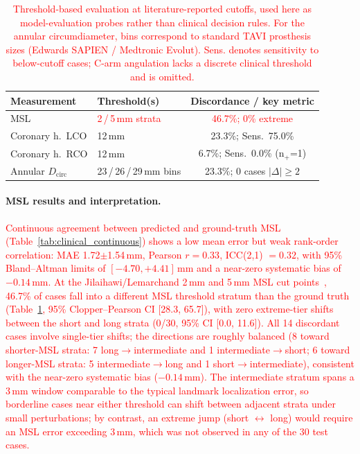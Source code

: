 \documentclass[conference]{IEEEtran}
\begin{document}
\begin{table}[t]
\centering
\caption{\textcolor{red}{Threshold-based evaluation at literature-reported cutoffs, used here as model-evaluation probes rather than clinical decision rules. For the annular circumdiameter, bins correspond to standard TAVI prosthesis sizes (Edwards SAPIEN / Medtronic Evolut). Sens. denotes sensitivity to below-cutoff cases; C-arm angulation lacks a discrete clinical threshold and is omitted.}}
\label{tab:clinical_discordance}
\setlength{\tabcolsep}{3pt}
\footnotesize
\begin{tabular}{l l c}
\toprule
Measurement & Threshold(s) & Discordance / key metric \\
\midrule
MSL                   & \textcolor{red}{2\,/\,5\,mm strata}              & \textcolor{red}{46.7\%; 0\% extreme} \\
Coronary h.\ LCO      & 12\,mm                            & 23.3\%; Sens.\ 75.0\%     \\
Coronary h.\ RCO      & 12\,mm                            & 6.7\%; Sens.\ 0.0\% (n$_+$=1) \\
Annular $D_{\text{circ}}$ & 23\,/\,26\,/\,29\,mm bins     & 23.3\%; 0 cases $|\Delta|\!\geq\!2$ \\
\bottomrule
\end{tabular}
\end{table}

\paragraph{MSL results and interpretation.}
\textcolor{red}{Continuous agreement between predicted and ground-truth MSL (Table~\ref{tab:clinical_continuous}) shows a low mean error but weak rank-order correlation: MAE 1.72$\pm$1.54\,mm, Pearson $r = 0.33$, ICC(2,1) $= 0.32$, with 95\% Bland--Altman limits of $[-4.70, +4.41]$\,mm and a near-zero systematic bias of $-0.14$\,mm. At the Jilaihawi/Lemarchand 2\,mm and 5\,mm MSL cut points~\cite{Jilaihawi2019_msl,Lemarchand2023_nocd}, 46.7\% of cases fall into a different MSL threshold stratum than the ground truth (Table~\ref{tab:clinical_discordance}, 95\% Clopper--Pearson CI [28.3, 65.7]), with zero extreme-tier shifts between the short and long strata (0/30, 95\% CI [0.0, 11.6]). All 14 discordant cases involve single-tier shifts; the directions are roughly balanced (8 toward shorter-MSL strata: 7 long$\to$intermediate and 1 intermediate$\to$short; 6 toward longer-MSL strata: 5 intermediate$\to$long and 1 short$\to$intermediate), consistent with the near-zero systematic bias ($-0.14$\,mm). The intermediate stratum spans a 3\,mm window comparable to the typical landmark localization error, so borderline cases near either threshold can shift between adjacent strata under small perturbations; by contrast, an extreme jump (short $\leftrightarrow$ long) would require an MSL error exceeding 3\,mm, which was not observed in any of the 30 test cases.}
\end{document}
